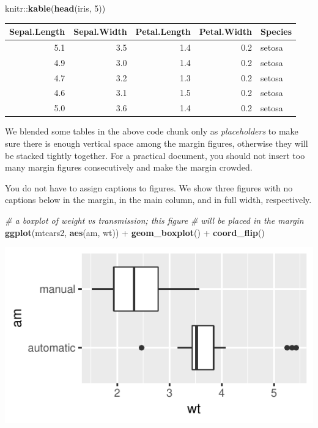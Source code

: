 \documentclass[]{tufte-handout}
\newenvironment{Shaded}{}{}
\newcommand{\KeywordTok}[1]{\textcolor[rgb]{0.00,0.44,0.13}{\textbf{#1}}}
\newcommand{\DecValTok}[1]{\textcolor[rgb]{0.25,0.63,0.44}{#1}}
\newcommand{\StringTok}[1]{\textcolor[rgb]{0.25,0.44,0.63}{#1}}
\newcommand{\CommentTok}[1]{\textcolor[rgb]{0.38,0.63,0.69}{\textit{#1}}}
\newcommand{\OperatorTok}[1]{\textcolor[rgb]{0.40,0.40,0.40}{#1}}
\newcommand{\NormalTok}[1]{#1}
\begin{document}
\begin{Shaded}
\begin{Highlighting}[]
\NormalTok{knitr}\OperatorTok{::}\KeywordTok{kable}\NormalTok{(}\KeywordTok{head}\NormalTok{(iris, }\DecValTok{5}\NormalTok{))}
\end{Highlighting}
\end{Shaded}

\begin{longtable}[]{@{}rrrrl@{}}
\toprule
Sepal.Length & Sepal.Width & Petal.Length & Petal.Width &
Species\tabularnewline
\midrule
\endhead
5.1 & 3.5 & 1.4 & 0.2 & setosa\tabularnewline
4.9 & 3.0 & 1.4 & 0.2 & setosa\tabularnewline
4.7 & 3.2 & 1.3 & 0.2 & setosa\tabularnewline
4.6 & 3.1 & 1.5 & 0.2 & setosa\tabularnewline
5.0 & 3.6 & 1.4 & 0.2 & setosa\tabularnewline
\bottomrule
\end{longtable}

We blended some tables in the above code chunk only as
\emph{placeholders} to make sure there is enough vertical space among
the margin figures, otherwise they will be stacked tightly together. For
a practical document, you should not insert too many margin figures
consecutively and make the margin crowded.

You do not have to assign captions to figures. We show three figures
with no captions below in the margin, in the main column, and in full
width, respectively.

\begin{Shaded}
\begin{Highlighting}[]
\CommentTok{# a boxplot of weight vs transmission; this figure}
\CommentTok{# will be placed in the margin}
\KeywordTok{ggplot}\NormalTok{(mtcars2, }\KeywordTok{aes}\NormalTok{(am, wt)) }\OperatorTok{+}\StringTok{ }\KeywordTok{geom_boxplot}\NormalTok{() }\OperatorTok{+}
\StringTok{  }\KeywordTok{coord_flip}\NormalTok{()}
\end{Highlighting}
\end{Shaded}

\begin{marginfigure}
\includegraphics{TufteExample_files/figure-latex/fig-nocap-margin-1} \end{marginfigure}
\end{document}
